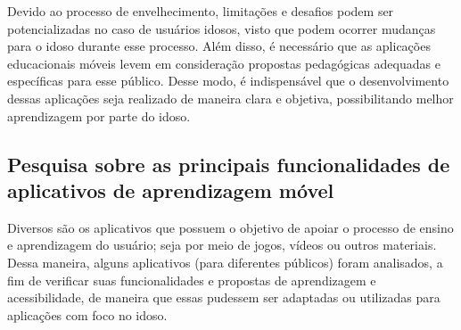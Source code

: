 Devido ao processo de envelhecimento, limitações e desafios podem ser potencializadas no caso de usuários idosos, visto que podem ocorrer mudanças para o idoso durante esse processo. Além disso, é necessário que as aplicações educacionais móveis levem em consideração propostas pedagógicas adequadas e específicas para esse público. Desse modo, é indispensável que o desenvolvimento dessas aplicações seja realizado de maneira clara e objetiva, possibilitando melhor aprendizagem por parte do idoso.

\subsection{Pesquisa sobre as principais funcionalidades de aplicativos de aprendizagem móvel} 
Diversos são os aplicativos que possuem o objetivo de apoiar o processo de ensino e aprendizagem do usuário; seja por meio de jogos, vídeos ou outros materiais. Dessa maneira, alguns aplicativos (para diferentes públicos) foram analisados, a fim de verificar suas funcionalidades e propostas de aprendizagem e acessibilidade, de maneira que essas pudessem ser adaptadas ou utilizadas para aplicações com foco no idoso.

